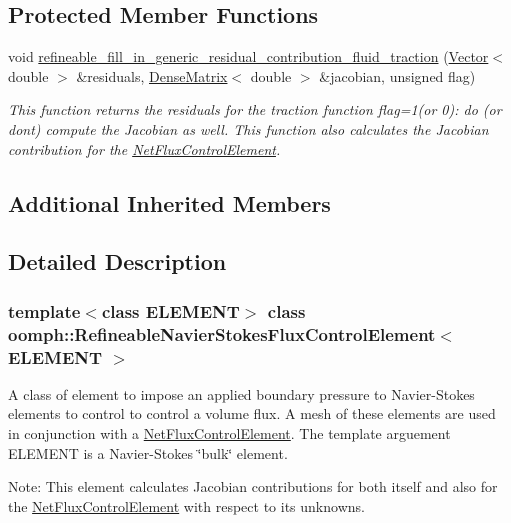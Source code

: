 \subsection*{Protected Member Functions}
\begin{DoxyCompactItemize}
\item 
void \hyperlink{classoomph_1_1RefineableNavierStokesFluxControlElement_a74cf9a3dc75276ce2eaefe6b8255811f}{refineable\+\_\+fill\+\_\+in\+\_\+generic\+\_\+residual\+\_\+contribution\+\_\+fluid\+\_\+traction} (\hyperlink{classoomph_1_1Vector}{Vector}$<$ double $>$ \&residuals, \hyperlink{classoomph_1_1DenseMatrix}{Dense\+Matrix}$<$ double $>$ \&jacobian, unsigned flag)
\begin{DoxyCompactList}\small\item\em This function returns the residuals for the traction function flag=1(or 0)\+: do (or don\textquotesingle{}t) compute the Jacobian as well. This function also calculates the Jacobian contribution for the \hyperlink{classoomph_1_1NetFluxControlElement}{Net\+Flux\+Control\+Element}. \end{DoxyCompactList}\end{DoxyCompactItemize}
\subsection*{Additional Inherited Members}


\subsection{Detailed Description}
\subsubsection*{template$<$class E\+L\+E\+M\+E\+NT$>$\newline
class oomph\+::\+Refineable\+Navier\+Stokes\+Flux\+Control\+Element$<$ E\+L\+E\+M\+E\+N\+T $>$}

A class of element to impose an applied boundary pressure to Navier-\/\+Stokes elements to control to control a volume flux. A mesh of these elements are used in conjunction with a \hyperlink{classoomph_1_1NetFluxControlElement}{Net\+Flux\+Control\+Element}. The template arguement E\+L\+E\+M\+E\+NT is a Navier-\/\+Stokes \char`\"{}bulk\char`\"{} element.

Note\+: This element calculates Jacobian contributions for both itself and also for the \hyperlink{classoomph_1_1NetFluxControlElement}{Net\+Flux\+Control\+Element} with respect to its unknowns.

